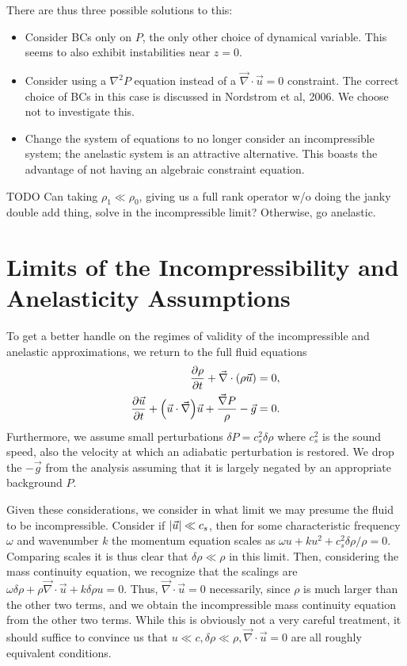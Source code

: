 \documentclass[11pt,
        usenames, %
        dvipsnames %
    ]{report}
\newcommand*{\pd}[2]{\frac{\partial#1}{\partial#2}}
\DeclarePairedDelimiter\abs{\lvert}{\rvert}
\DeclarePairedDelimiter\p{\lparen}{\rparen}
\begin{document}
There are thus three possible solutions to this:
\begin{itemize}
    \item Consider BCs only on $P$, the only other choice of dynamical variable.
        This seems to also exhibit instabilities near $z = 0$.

    \item Consider using a $\nabla^2 P$ equation instead of a $\vec{\nabla}
        \cdot \vec{u} = 0$ constraint. The correct choice of BCs in this case is
        discussed in Nordstrom et al, 2006. We choose not to investigate this.

    \item Change the system of equations to no longer consider an incompressible
        system; the anelastic system is an attractive alternative. This boasts
        the advantage of not having an algebraic constraint equation.
\end{itemize}

TODO Can taking $\rho_1 \ll \rho_0$, giving us a full rank operator w/o doing
the janky double add thing, solve in the incompressible limit? Otherwise, go
anelastic.

\section{Limits of the Incompressibility and Anelasticity Assumptions}

To get a better handle on the regimes of validity of the incompressible and
anelastic approximations, we return to the full fluid equations
\begin{equation}
    \begin{split}
        \pd{\rho}{t} + \vec{\nabla} \cdot \p*{\rho \vec{u}} &= 0,\\
        \pd{\vec{u}}{t} + \p*{\vec{u} \cdot \vec{\nabla}}\vec{u} +
            \frac{\vec{\nabla}P}{\rho} - \vec{g} &= 0.
    \end{split}
\end{equation}
Furthermore, we assume small perturbations $\delta P = c_s^2 \delta \rho$ where
$c_s^2$ is the sound speed, also the velocity at which an adiabatic perturbation
is restored. We drop the $-\vec{g}$ from the analysis assuming that it is
largely negated by an appropriate background $P$.

Given these considerations, we consider in what limit we may presume the fluid
to be incompressible. Consider if $\abs*{\vec{u}} \ll c_s$, then for some
characteristic frequency $\omega$ and wavenumber $k$ the momentum equation
scales as $\omega u + ku^2 + c_s^2 \delta \rho/\rho = 0$. Comparing scales it is
thus clear that $\delta \rho \ll \rho$ in this limit. Then, considering the
mass continuity equation, we recognize that the scalings are $\omega \delta \rho
+ \rho \vec{\nabla} \cdot \vec{u} + k\delta \rho u = 0$. Thus, $\vec{\nabla}
\cdot \vec{u} = 0$ necessarily, since $\rho$ is much larger than the other two
terms, and we obtain the incompressible mass continuity equation from the other
two terms. While this is obviously not a very careful treatment, it should
suffice to convince us that $u \ll c, \delta \rho \ll \rho, \vec{\nabla} \cdot
\vec{u} = 0$ are all roughly equivalent conditions.
\end{document}
